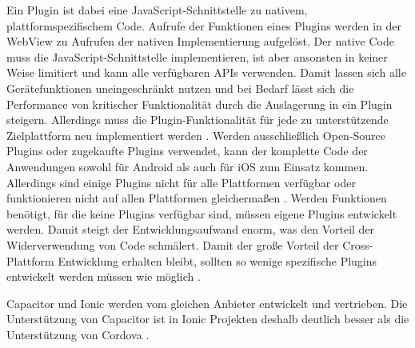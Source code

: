 Ein Plugin ist dabei eine JavaScript-Schnittstelle zu nativem, plattformspezifischem Code.
Aufrufe der Funktionen eines Plugins werden in der WebView zu Aufrufen der nativen Implementierung aufgelöst.
Der native Code muss die JavaScript-Schnittstelle implementieren, ist aber ansonsten in keiner Weise limitiert und kann alle verfügbaren \acp{API} verwenden.
Damit lassen sich alle Gerätefunktionen uneingeschränkt nutzen und bei Bedarf lässt sich die Performance von kritischer Funktionalität durch die Auslagerung in ein Plugin steigern.
Allerdings muss die Plugin-Funktionalität für jede zu unterstützende Zielplattform neu implementiert werden \cite{Steyer_Cordova}.
Werden ausschließlich Open-Source Plugins oder zugekaufte Plugins verwendet, kann der komplette Code der Anwendungen sowohl für Android als auch für iOS zum Einsatz kommen.
Allerdings sind einige Plugins nicht für alle Plattformen verfügbar oder funktionieren nicht auf allen Plattformen gleichermaßen \cite{Cordova_Plugin_Problem}.
Werden Funktionen benötigt, für die keine Plugins verfügbar sind, müssen eigene Plugins entwickelt werden.
Damit steigt der Entwicklungsaufwand enorm, was den Vorteil der Widerverwendung von Code schmälert.
Damit der große Vorteil der Cross-Plattform Entwicklung erhalten bleibt, sollten so wenige spezifische Plugins entwickelt werden müssen wie möglich \cite{Cordova_Development_Tips}.


Capacitor und Ionic werden vom gleichen Anbieter entwickelt und vertrieben.
Die Unterstützung von Capacitor ist in Ionic Projekten deshalb deutlich besser als die Unterstützung von Cordova \cite{Ionic_Cordova_vs_Capacitor}.



